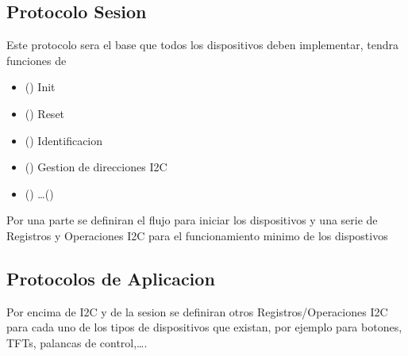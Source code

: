 \subsection{Protocolo Sesion}
Este protocolo sera el base que todos los dispositivos deben implementar, tendra funciones de
\begin{itemize}
    \item() Init
    \item() Reset
    \item() Identificacion
    \item() Gestion de direcciones I2C
    \item() \dots()
\end{itemize}

Por una parte se definiran el flujo para iniciar los dispositivos y una serie de Registros y Operaciones I2C para
el funcionamiento minimo de los dispostivos

\subsection{Protocolos de Aplicacion}

Por encima de I2C y de la sesion se definiran otros Registros/Operaciones I2C para cada uno de los tipos de
dispositivos que existan,  por ejemplo para botones, TFTs, palancas de control,\dots.
